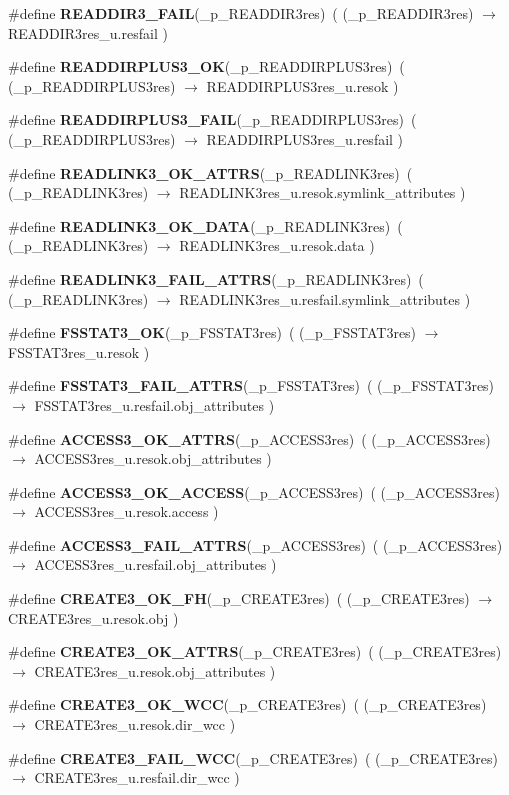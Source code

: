 \begin{CompactItemize}
\#define {\bf READDIR3\_\-FAIL}(\_\-p\_\-READDIR3res)\ ( (\_\-p\_\-READDIR3res) $\rightarrow$ READDIR3res\_\-u.resfail )
\item 
\#define {\bf READDIRPLUS3\_\-OK}(\_\-p\_\-READDIRPLUS3res)\ ( (\_\-p\_\-READDIRPLUS3res) $\rightarrow$ READDIRPLUS3res\_\-u.resok )
\item 
\#define {\bf READDIRPLUS3\_\-FAIL}(\_\-p\_\-READDIRPLUS3res)\ ( (\_\-p\_\-READDIRPLUS3res) $\rightarrow$ READDIRPLUS3res\_\-u.resfail )
\item 
\#define {\bf READLINK3\_\-OK\_\-ATTRS}(\_\-p\_\-READLINK3res)\ ( (\_\-p\_\-READLINK3res) $\rightarrow$ READLINK3res\_\-u.resok.symlink\_\-attributes )
\item 
\#define {\bf READLINK3\_\-OK\_\-DATA}(\_\-p\_\-READLINK3res)\ ( (\_\-p\_\-READLINK3res) $\rightarrow$ READLINK3res\_\-u.resok.data )
\item 
\#define {\bf READLINK3\_\-FAIL\_\-ATTRS}(\_\-p\_\-READLINK3res)\ ( (\_\-p\_\-READLINK3res) $\rightarrow$ READLINK3res\_\-u.resfail.symlink\_\-attributes )
\item 
\#define {\bf FSSTAT3\_\-OK}(\_\-p\_\-FSSTAT3res)\ ( (\_\-p\_\-FSSTAT3res) $\rightarrow$ FSSTAT3res\_\-u.resok )
\item 
\#define {\bf FSSTAT3\_\-FAIL\_\-ATTRS}(\_\-p\_\-FSSTAT3res)\ ( (\_\-p\_\-FSSTAT3res) $\rightarrow$ FSSTAT3res\_\-u.resfail.obj\_\-attributes )
\item 
\#define {\bf ACCESS3\_\-OK\_\-ATTRS}(\_\-p\_\-ACCESS3res)\ ( (\_\-p\_\-ACCESS3res) $\rightarrow$ ACCESS3res\_\-u.resok.obj\_\-attributes )
\item 
\#define {\bf ACCESS3\_\-OK\_\-ACCESS}(\_\-p\_\-ACCESS3res)\ ( (\_\-p\_\-ACCESS3res) $\rightarrow$ ACCESS3res\_\-u.resok.access )
\item 
\#define {\bf ACCESS3\_\-FAIL\_\-ATTRS}(\_\-p\_\-ACCESS3res)\ ( (\_\-p\_\-ACCESS3res) $\rightarrow$ ACCESS3res\_\-u.resfail.obj\_\-attributes )
\item 
\#define {\bf CREATE3\_\-OK\_\-FH}(\_\-p\_\-CREATE3res)\ ( (\_\-p\_\-CREATE3res) $\rightarrow$ CREATE3res\_\-u.resok.obj )
\item 
\#define {\bf CREATE3\_\-OK\_\-ATTRS}(\_\-p\_\-CREATE3res)\ ( (\_\-p\_\-CREATE3res) $\rightarrow$ CREATE3res\_\-u.resok.obj\_\-attributes )
\item 
\#define {\bf CREATE3\_\-OK\_\-WCC}(\_\-p\_\-CREATE3res)\ ( (\_\-p\_\-CREATE3res) $\rightarrow$ CREATE3res\_\-u.resok.dir\_\-wcc )
\item 
\#define {\bf CREATE3\_\-FAIL\_\-WCC}(\_\-p\_\-CREATE3res)\ ( (\_\-p\_\-CREATE3res) $\rightarrow$ CREATE3res\_\-u.resfail.dir\_\-wcc )

\end{CompactItemize}
